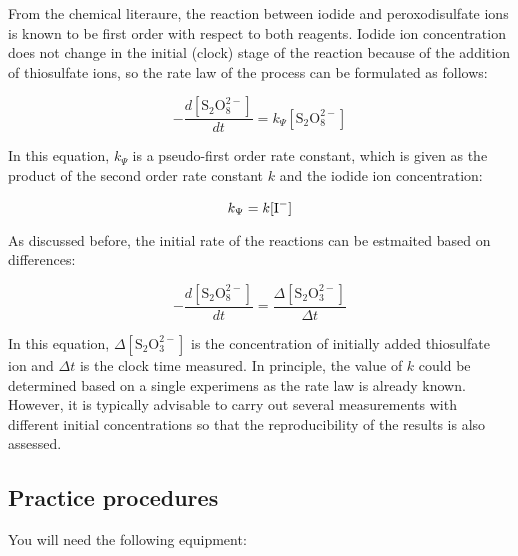 From the chemical literaure, the reaction between iodide and peroxodisulfate ions is known to be first order with respect to both reagents. Iodide ion concentration does not change in the initial (clock) stage of the reaction because of the addition of thiosulfate ions, so the rate law of the process can be formulated as follows:

\begin{equation}
- \frac{d[\text{S}_2 \text{O}_8^{2-}]}{dt} = k_{\Psi}[\text{S}_2 \text{O}_8^{2-}]
\end{equation}

In this equation,  $k_{\Psi}$ is a pseudo-first order rate constant, which is given as the product of the second order rate constant $k$ and the iodide ion concentration:

\begin{equation}
k_{\Psi} = k[\text I^{-}]
\end{equation}

As discussed before, the initial rate of the reactions can be estmaited based on differences:

\begin{equation}
- \frac{d[\text{S}_2 \text{O}_8^{2-}]}{dt} = \frac{\Delta [\text{S}_2 \text{O}_3^{2-}]}{\Delta t}
\end{equation}

In this equation, $\Delta [\text{S}_2 \text{O}_3^{2-}]$ is the concentration of initially added thiosulfate ion and $\Delta t$ is the clock time measured. In principle, the value of $k$ could be determined based on a single experimens as the rate  law is already known. However, it is typically advisable to carry out several measurements with different initial concentrations so that the reproducibility of the results is also assessed.



\subsection{Practice procedures}

You will need the following equipment:

